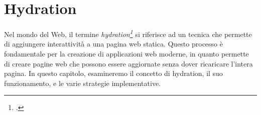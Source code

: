 \chapter{Hydration}
\label{ch:hydration}

Nel mondo del Web, il termine \textit{hydration\footcite{hydration}} si riferisce ad un tecnica che permette di aggiungere interattività a
una pagina web statica. Questo processo è fondamentale per la creazione di applicazioni web moderne, in quanto permette
di creare pagine web che possono essere aggiornate senza dover ricaricare l'intera pagina. In questo capitolo,
esamineremo il concetto di hydration, il suo funzionamento, e le varie strategie implementative.




